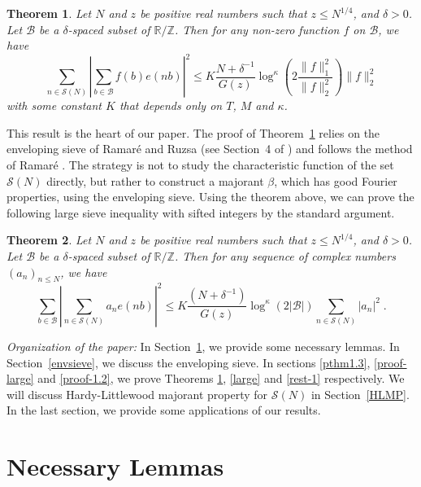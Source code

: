 \documentclass[12pt,article]{amsart}
\newtheorem{theorem}{Theorem}[section]
\theoremstyle{remark}
\numberwithin{equation}{section}
\begin{document}
	
	\begin{theorem}\label{dual}
		Let $N$ and $z$ be  positive real numbers such that $z\leq N^{1/4}$, and $\delta>0$. Let $\mathcal{B}$ be a $\delta$-spaced subset of $\mathbb{R}/\mathbb{Z}$. Then for any non-zero function $f$ on $\mathcal{B}$, we have
		\[\sum_{n\in \mathcal{S}(N)}\left|\sum_{b\in \mathcal{B}}f(b)e(nb)\right|^2\leq K \frac{N+\delta^{-1}} {G(z)}\log^\kappa\left(2\frac{\|f\|_1^2}{\|f\|_2^2}\right)\|f\|_2^2\]
		with some constant $K$ that depends only on $T$, $M$ and $\kappa$.
	\end{theorem}
	\vspace{2mm}
	\noindent	
	This result is the heart of our paper. The proof of Theorem~\ref{dual} relies on the enveloping sieve of Ramar\'e and Ruzsa (see Section~4 of \cite{Ramare-ruzsa}) and follows the method of Ramar\'e \cite{ramare24}.   The strategy  is
	not to study the characteristic function of the set $\mathcal{S}(N)$ directly, but rather to construct a majorant $\beta$, which has good Fourier properties, using the enveloping sieve. 
	Using the theorem above, we can prove the following large sieve inequality with sifted integers by the standard argument.
	
	\begin{theorem}\label{dual1}
		\label{large}
		Let $N$ and $z$ be  positive real numbers such that $z\leq N^{1/4}$, and $\delta>0$. Let $\mathcal{B}$ be a $\delta$-spaced subset of $\mathbb{R}/\mathbb{Z}$. Then for any sequence of complex numbers $(a_n)_{n\leq N}$, we have 
		\[
		\sum_{b\in \mathcal{B}}\left|\sum_{n\in \mathcal{S}(N)}a_ne(nb)\right|^2\leq K \frac{(N+\delta^{-1})}{G(z)}\log^{\kappa}(2|\mathcal{B}|) \sum_{n\in \mathcal{S}(N)}|a_n|^2\; .
		\]
	\end{theorem}
	
	
	\noindent
	{\em Organization of the paper:} In Section~\ref{nlms},  we provide some necessary lemmas.  In Section~\ref{envsieve}, we discuss the enveloping sieve. In sections \ref{pthm1.3}, \ref{proof-large} and \ref{proof-1.2}, we prove Theorems \ref{dual}, \ref{large} and \ref{rest-1} respectively. We will discuss Hardy-Littlewood majorant property for $\mathcal{S}(N)$ in  Section~\ref{HLMP}. In the last section, we provide some applications of our results.
	
	
	\section{Necessary Lemmas}\label{nlms}
	\noindent
	
\end{document}
